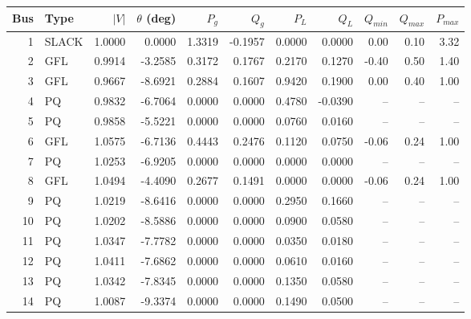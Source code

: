 \begin{tabular*}{\textwidth}{@{\extracolsep{\fill}}rlrrrrrrrrr@{}}\toprule
Bus & Type & $|V|$ & $\theta$ (deg) & $P_g$ & $Q_g$ & $P_L$ & $Q_L$ & $Q_{min}$ & $Q_{max}$ & $P_{max}$ \\ \midrule
1 & SLACK & 1.0000 & 0.0000 & 1.3319 & -0.1957 & 0.0000 & 0.0000 & 0.00 & 0.10 & 3.32 \\
2 & GFL & 0.9914 & -3.2585 & 0.3172 & 0.1767 & 0.2170 & 0.1270 & -0.40 & 0.50 & 1.40 \\
3 & GFL & 0.9667 & -8.6921 & 0.2884 & 0.1607 & 0.9420 & 0.1900 & 0.00 & 0.40 & 1.00 \\
4 & PQ & 0.9832 & -6.7064 & 0.0000 & 0.0000 & 0.4780 & -0.0390 & -- & -- & -- \\
5 & PQ & 0.9858 & -5.5221 & 0.0000 & 0.0000 & 0.0760 & 0.0160 & -- & -- & -- \\
6 & GFL & 1.0575 & -6.7136 & 0.4443 & 0.2476 & 0.1120 & 0.0750 & -0.06 & 0.24 & 1.00 \\
7 & PQ & 1.0253 & -6.9205 & 0.0000 & 0.0000 & 0.0000 & 0.0000 & -- & -- & -- \\
8 & GFL & 1.0494 & -4.4090 & 0.2677 & 0.1491 & 0.0000 & 0.0000 & -0.06 & 0.24 & 1.00 \\
9 & PQ & 1.0219 & -8.6416 & 0.0000 & 0.0000 & 0.2950 & 0.1660 & -- & -- & -- \\
10 & PQ & 1.0202 & -8.5886 & 0.0000 & 0.0000 & 0.0900 & 0.0580 & -- & -- & -- \\
11 & PQ & 1.0347 & -7.7782 & 0.0000 & 0.0000 & 0.0350 & 0.0180 & -- & -- & -- \\
12 & PQ & 1.0411 & -7.6862 & 0.0000 & 0.0000 & 0.0610 & 0.0160 & -- & -- & -- \\
13 & PQ & 1.0342 & -7.8345 & 0.0000 & 0.0000 & 0.1350 & 0.0580 & -- & -- & -- \\
14 & PQ & 1.0087 & -9.3374 & 0.0000 & 0.0000 & 0.1490 & 0.0500 & -- & -- & -- \\
\bottomrule\end{tabular*}
